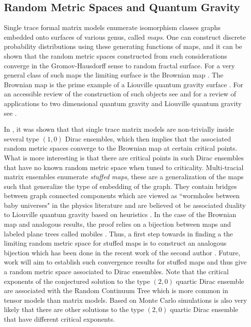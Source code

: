 \documentclass[11pt]{article}
\theoremstyle{plain}
\begin{document}
\subsection{Random Metric Spaces and Quantum Gravity}
Single trace formal matrix models enumerate isomorphism classes graphs embedded onto surfaces of various genus, called \textit{maps}. One can construct discrete probability distributions using these generating functions of maps, and it can be shown that the random metric spaces constructed from such considerations converge in the Gromov-Hausdorff sense to random fractal surface. For a very general class of such maps the limiting surface is the Brownian map \cite{LeGall,Miermont}. The Brownian map is the prime example of a Liouville quantum gravity surface \cite{gwynne}.  For an accessible review of the construction of such objects see \cite{LeGall review} and for a review of applications to two dimensional quantum gravity and Liouville quantum gravity see \cite{Budd QG}. 

In \cite{hessam2023double}, it was shown that that single trace matrix models are non-trivially inside several type $(1,0)$ Dirac ensembles, which then implies that the associated random metric spaces converge to the Brownian map at certain critical points. What is more interesting is that there are critical points in such Dirac ensembles that have no known random metric space when tuned to criticality. Multi-tracial matrix ensembles enumerate \textit{stuffed maps}, these are a generalization of the maps such that generalize the type of embedding of the graph. They contain bridges between graph connected components which are viewed as ``wormholes between baby universes" in the physics literature and are believed ot be associated duality to Liouville quantum gravity based on heuristics \cite{Rhodes review}. In the case of the Brownian map and analogous results, the proof relies on a bijection between maps and labeled plane trees called mobiles \cite{Bouttier}. Thus, a first step towards in finding a the limiting random metric space for stuffed maps is to construct an analogous bijection which has been done in the recent work of the second author \cite{Pagliaroli2025}. Future, work will aim to establish such convergence results for stuffed maps and thus give a random metric space associated to Dirac ensembles. Note that the critical exponents of the conjectured solution to the type $(2,0)$ quartic Dirac ensemble are associated with the Random Continuum Tree which is more common in tensor models than matrix models. Based on Monte Carlo simulations is also very likely that there are other solutions to the type $(2,0)$ quartic Dirac ensemble that have different critical exponents.
\end{document}
